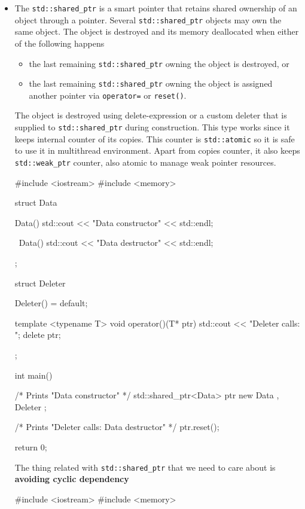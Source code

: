 \documentclass[../main]{subfiles}
\begin{document}
\begin{itemize}
    \item The \texttt{std::shared\_ptr} is a smart pointer that retains shared ownership of an object through a pointer.
    Several \texttt{std::shared\_ptr} objects may own the same object. The object is destroyed and its memory deallocated when either of the following happens
    \begin{itemize}
        \item the last remaining \texttt{std::shared\_ptr} owning the object is destroyed, or
        \item the last remaining \texttt{std::shared\_ptr} owning the object is assigned another pointer via \texttt{operator=} or \texttt{reset()}.
    \end{itemize}
        The object is destroyed using delete-expression or a custom deleter that is supplied to \texttt{std::shared\_ptr} during construction.
        This type works since it keeps internal counter of its copies. This counter is \texttt{std::atomic} so it is safe to use it
        in multithread environment. Apart from copies counter, it also keeps \texttt{std::weak\_ptr} counter, also atomic to manage
        weak pointer resources.
    \begin{Code}
        #include <iostream>
        #include <memory>
        
        struct Data
        {
            Data()
            {
                std::cout << "Data constructor" << std::endl;
            }
            
            ~Data()
            {
                std::cout << "Data destructor" << std::endl;
            }
        };
        
        struct Deleter
        {
            Deleter() = default;
            
            template <typename T>
            void operator()(T* ptr)
            {
                std::cout << "Deleter calls: ";
                delete ptr;
            }
        };
        
        int main()
        {
            /* Prints "Data constructor" */
            std::shared_ptr<Data> ptr { new Data {}, Deleter {} };
            
            /* Prints "Deleter calls: Data destructor" */
            ptr.reset();
            
            return 0;
        }
    \end{Code}
    
    The thing related with \texttt{std::shared\_ptr} that we need to care
    about is \textbf{avoiding cyclic dependency}
    \begin{Code}
        #include <iostream>
        #include <memory>
        

\end{Code}
\end{itemize}
\end{document}
